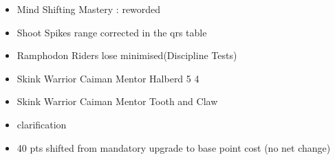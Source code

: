 \largefontsize{}

\subtitle{2023 Alpha 1 hotfix 1}

\begin{itemize}
	\item Mind Shifting Mastery : reworded
	\item Shoot Spikes range corrected in the qrs table
	\item Ramphodon Riders lose minimised(Discipline Tests)
	\item Skink Warrior Caiman Mentor Halberd 5 \costdown{} 4
	\item Skink Warrior Caiman Mentor Tooth and Claw \free{}
	\item \lodestone{} clarification
	\item \anurarcharchmage{} 40 pts shifted from mandatory upgrade to base point cost (no net change)
\end{itemize}

